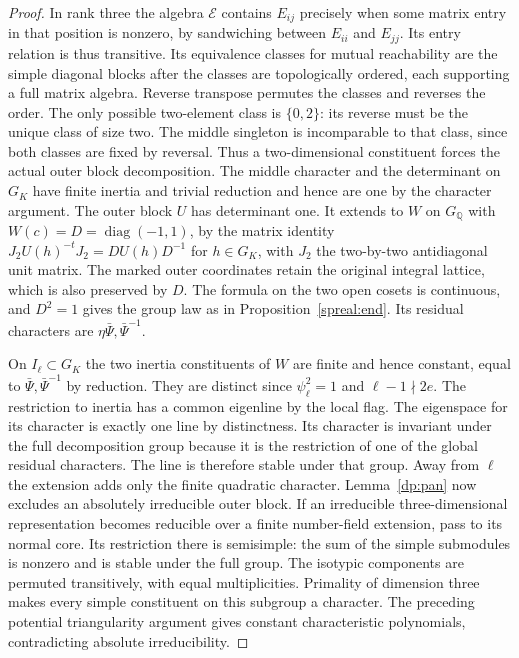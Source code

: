 \begin{proof}
In rank three the algebra \(\mathcal E\) contains \(E_{ij}\)
precisely when some matrix entry in that position is nonzero, by
sandwiching between \(E_{ii}\) and \(E_{jj}\). Its entry relation
is thus transitive. Its equivalence classes for mutual
reachability are the simple diagonal blocks after the classes
are topologically ordered, each supporting a full matrix algebra.
Reverse transpose permutes the classes and reverses the order.
The only possible two-element class is \(\{0,2\}\): its reverse
must be the unique class of size two. The middle singleton is
incomparable to that class, since both classes are fixed by
reversal. Thus a two-dimensional constituent forces the actual
outer block decomposition. The middle character and the determinant
on \(G_K\) have finite inertia and trivial reduction and hence are
one by the character argument. The outer block \(U\) has determinant
one. It extends to \(W\) on \(G_{\mathbb Q}\) with
\(W(c)=D=\operatorname{diag}(-1,1)\), by the matrix identity
\(J_2 U(h)^{-t}J_2=D U(h)D^{-1}\) for \(h\in G_K\), with
\(J_2\) the two-by-two antidiagonal unit matrix. The marked
outer coordinates retain the original integral lattice, which
is also preserved by \(D\). The formula on the two open cosets
is continuous, and \(D^2=1\) gives the group law
as in Proposition~\ref{spreal:end}.
Its residual characters are \(\eta\bar\Psi,\bar\Psi^{-1}\).

On \(I_\ell\subset G_K\) the two inertia constituents of \(W\)
are finite and hence constant, equal to \(\bar\Psi,\bar\Psi^{-1}\)
by reduction. They are distinct since \(\psi_\ell^2=1\) and
\(\ell-1\nmid2e\). The restriction to inertia has a common eigenline
by the local flag. The eigenspace for its character is exactly one
line by distinctness. Its character is invariant under the full
decomposition group because it is the restriction of one of the
global residual characters. The line is therefore stable under
that group. Away from \(\ell\) the extension adds only the finite
quadratic character. Lemma~\ref{dp:pan} now excludes an absolutely
irreducible outer block. If an irreducible three-dimensional
representation becomes reducible over a finite number-field
extension, pass to its normal core. Its restriction there is
semisimple: the sum of the simple submodules is nonzero and is
stable under the full group. The isotypic components are permuted
transitively, with equal multiplicities. Primality of dimension
three makes every simple constituent on this subgroup a character.
The preceding potential triangularity argument gives constant
characteristic polynomials, contradicting absolute irreducibility.


\end{proof}
